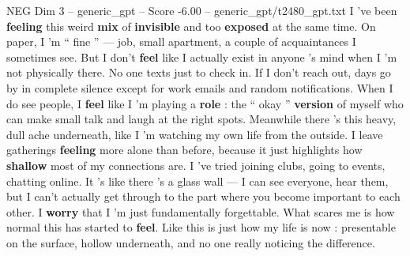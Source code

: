 \begin{textsample}{NEG Dim 3 – generic\_gpt – Score -6.00 – generic\_gpt/t2480\_gpt.txt}  \label{ex:f3_neg_003}
I ’ve been \textbf{feeling} this weird \textbf{mix} of \textbf{invisible} and too \textbf{exposed} at the same time.
On paper, I ’m “ fine ” — job, small apartment, a couple of acquaintances I sometimes see.
But I don't \textbf{feel} like I actually exist in anyone ’s mind when I ’m not physically there.
No one texts just to check in.
If I don't reach out, days go by in complete silence except for work emails and random notifications.
When I do see people, I \textbf{feel} like I ’m playing a \textbf{role} : the “ okay ” \textbf{version} of myself who can make small talk and laugh at the right spots.
Meanwhile there ’s this heavy, dull ache underneath, like I ’m watching my own life from the outside.
I leave gatherings \textbf{feeling} more alone than before, because it just highlights how \textbf{shallow} most of my connections are.
I ’ve tried joining clubs, going to events, chatting online.
It ’s like there ’s a glass wall — I can see everyone, hear them, but I can't actually get through to the part where you become important to each other.
I \textbf{worry} that I ’m just fundamentally forgettable.
What scares me is how normal this has started to \textbf{feel}.
Like this is just how my life is now : presentable on the surface, hollow underneath, and no one really noticing the difference.

\end{textsample}
